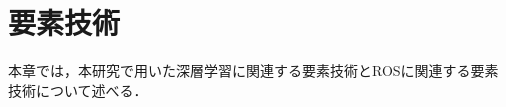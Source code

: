\chapter{要素技術}

  本章では，本研究で用いた深層学習に関連する要素技術とROSに関連する要素技術について述べる．

\label{chap:technology}
%

% 


%
